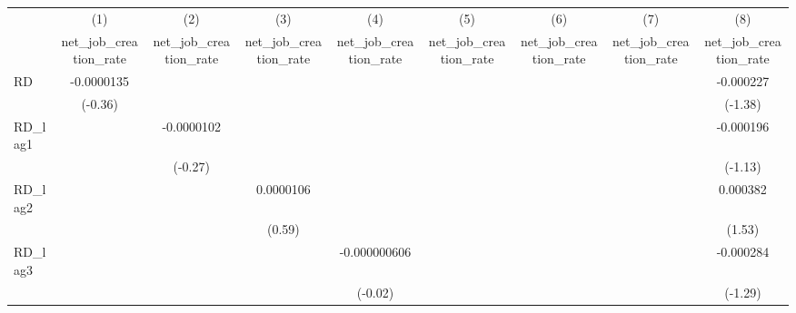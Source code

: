 {
\def\sym#1{\ifmmode^{#1}\else\(^{#1}\)\fi}
\begin{tabular}{l*{8}{c}}
\toprule
            &\multicolumn{1}{c}{(1)}&\multicolumn{1}{c}{(2)}&\multicolumn{1}{c}{(3)}&\multicolumn{1}{c}{(4)}&\multicolumn{1}{c}{(5)}&\multicolumn{1}{c}{(6)}&\multicolumn{1}{c}{(7)}&\multicolumn{1}{c}{(8)}\\
            &\multicolumn{1}{c}{net\_job\_creation\_rate}&\multicolumn{1}{c}{net\_job\_creation\_rate}&\multicolumn{1}{c}{net\_job\_creation\_rate}&\multicolumn{1}{c}{net\_job\_creation\_rate}&\multicolumn{1}{c}{net\_job\_creation\_rate}&\multicolumn{1}{c}{net\_job\_creation\_rate}&\multicolumn{1}{c}{net\_job\_creation\_rate}&\multicolumn{1}{c}{net\_job\_creation\_rate}\\
\midrule
RD          &  -0.0000135         &                     &                     &                     &                     &                     &                     &   -0.000227         \\
            &     (-0.36)         &                     &                     &                     &                     &                     &                     &     (-1.38)         \\
\addlinespace
RD\_lag1     &                     &  -0.0000102         &                     &                     &                     &                     &                     &   -0.000196         \\
            &                     &     (-0.27)         &                     &                     &                     &                     &                     &     (-1.13)         \\
\addlinespace
RD\_lag2     &                     &                     &   0.0000106         &                     &                     &                     &                     &    0.000382         \\
            &                     &                     &      (0.59)         &                     &                     &                     &                     &      (1.53)         \\
\addlinespace
RD\_lag3     &                     &                     &                     &-0.000000606         &                     &                     &                     &   -0.000284         \\
            &                     &                     &                     &     (-0.02)         &                     &                     &                     &     (-1.29)         \\

\end{tabular}}
